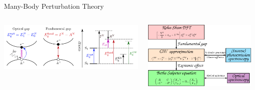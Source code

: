 \documentclass[aspectratio=169,9pt]{beamer}
\begin{document}


\begin{frame}{Many-Body Perturbation Theory}

        \begin{columns}
                \begin{column}{0.55\textwidth}
                        \centering
                        \includegraphics[width=1.05\textwidth]{fig/gaps}
                \end{column}
                \begin{column}{0.45\textwidth}
                        \includegraphics[width=1.00\textwidth]{fig/TOC_BSE-GW}
                \end{column}
        \end{columns}


\end{frame}
\end{document}
